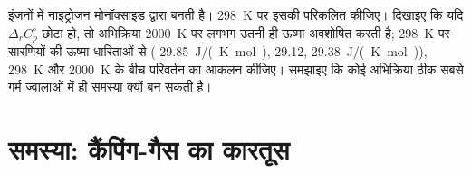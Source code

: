 \begin{exercise}[$\star\star\star$]\label{exo:b2:reaction-enthalpy:12}
इंजनों में नाइट्रोजन मोनॉक्साइड  द्वारा बनती है।
\qty{298}{K} पर इसकी  परिकलित कीजिए। दिखाइए कि यदि
$\Delta_r C_p^\circ$ छोटा हो, तो अभिक्रिया \qty{2000}{K} पर लगभग उतनी ही
ऊष्मा अवशोषित करती है; \qty{298}{K} पर सारणियों की ऊष्मा धारिताओं से
( \qty{29.85}{J/(K.mol)},  29.12, 
\qty{29.38}{J/(K.mol)}),
\qty{298}{K} और \qty{2000}{K} के बीच परिवर्तन का आकलन कीजिए। समझाइए कि कोई 
अभिक्रिया ठीक सबसे गर्म ज्वालाओं में ही समस्या क्यों बन सकती है।
\end{exercise}

\section{समस्या: कैंपिंग-गैस का कारतूस}

